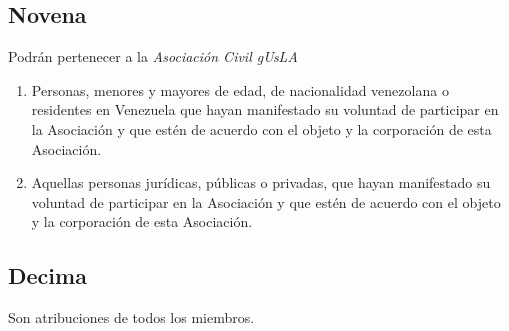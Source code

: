       \subsection{Novena}
        Podr\'an pertenecer a la \emph{Asociaci\'on Civil gUsLA}
        
        \begin{enumerate}

          \item 
            Personas, menores y mayores de edad, de nacionalidad venezolana o
            residentes en Venezuela que hayan manifestado su voluntad de
            participar en la Asociaci\'on y que est\'en de acuerdo con el objeto
            y la corporaci\'on de esta Asociaci\'on.

          \item 
            Aquellas personas jur\'i{}dicas, p\'ublicas o privadas, que hayan
            manifestado su voluntad de participar en la Asociaci\'on y que
            est\'en de acuerdo con el objeto y la corporaci\'on de esta
            Asociaci\'on.

        \end{enumerate}

      \subsection{Decima}
        Son atribuciones de todos los miembros.

